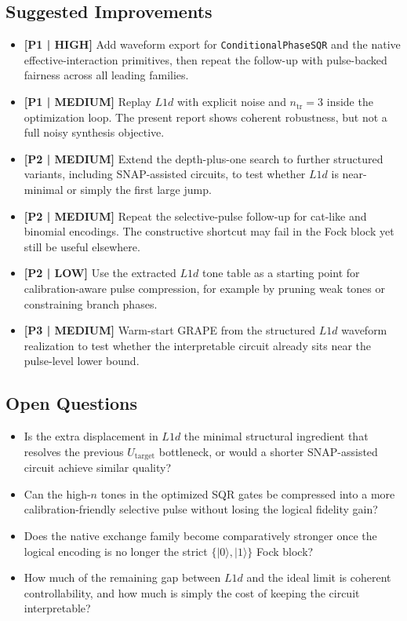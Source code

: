 \documentclass[11pt, a4paper]{article}
\begin{document}
\subsection{Suggested Improvements}
\begin{itemize}
\item \textbf{[P1 | HIGH]} Add waveform export for \texttt{ConditionalPhaseSQR} and the native effective-interaction primitives, then repeat the follow-up with pulse-backed fairness across all leading families.
\item \textbf{[P1 | MEDIUM]} Replay $L1d$ with explicit noise and $n_\mathrm{tr}=3$ inside the optimization loop. The present report shows coherent robustness, but not a full noisy synthesis objective.
\item \textbf{[P2 | MEDIUM]} Extend the depth-plus-one search to further structured variants, including SNAP-assisted circuits, to test whether $L1d$ is near-minimal or simply the first large jump.
\item \textbf{[P2 | MEDIUM]} Repeat the selective-pulse follow-up for cat-like and binomial encodings. The constructive shortcut may fail in the Fock block yet still be useful elsewhere.
\item \textbf{[P2 | LOW]} Use the extracted $L1d$ tone table as a starting point for calibration-aware pulse compression, for example by pruning weak tones or constraining branch phases.
\item \textbf{[P3 | MEDIUM]} Warm-start GRAPE from the structured $L1d$ waveform realization to test whether the interpretable circuit already sits near the pulse-level lower bound.
\end{itemize}

\subsection{Open Questions}
\begin{itemize}
\item Is the extra displacement in $L1d$ the minimal structural ingredient that resolves the previous $U_{\mathrm{target}}$ bottleneck, or would a shorter SNAP-assisted circuit achieve similar quality?
\item Can the high-$n$ tones in the optimized SQR gates be compressed into a more calibration-friendly selective pulse without losing the logical fidelity gain?
\item Does the native exchange family become comparatively stronger once the logical encoding is no longer the strict $\{|0\rangle,|1\rangle\}$ Fock block?
\item How much of the remaining gap between $L1d$ and the ideal limit is coherent controllability, and how much is simply the cost of keeping the circuit interpretable?
\end{itemize}



\end{document}
